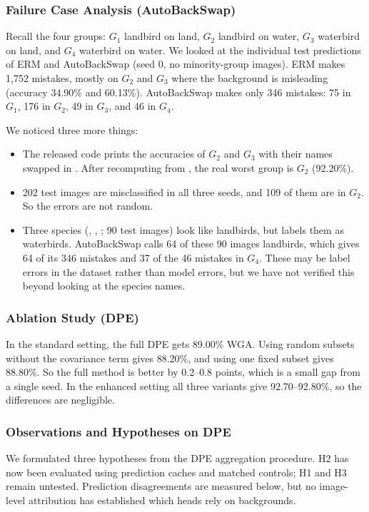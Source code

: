 \documentclass[runningheads]{llncs}
\begin{document}
\subsubsection{Failure Case Analysis (AutoBackSwap)}
Recall the four groups: $G_1$ landbird on land, $G_2$ landbird on water, $G_3$ waterbird on land, and $G_4$ waterbird on water. We looked at the individual test predictions of ERM and AutoBackSwap (seed 0, no minority-group images). ERM makes 1,752 mistakes, mostly on $G_2$ and $G_3$ where the background is misleading (accuracy 34.90\% and 60.13\%). AutoBackSwap makes only 346 mistakes: 75 in $G_1$, 176 in $G_2$, 49 in $G_3$, and 46 in $G_4$.

We noticed three more things:
\begin{itemize}
    \item The released code prints the accuracies of $G_2$ and $G_3$ with their names swapped in . After recomputing from , the real worst group is $G_2$ (92.20\%).
    \item 202 test images are misclassified in all three seeds, and 109 of them are in $G_2$. So the errors are not random.
    \item Three species (, , ; 90 test images) look like landbirds, but  labels them as waterbirds. AutoBackSwap calls 64 of these 90 images landbirds, which gives 64 of its 346 mistakes and 37 of the 46 mistakes in $G_4$. These may be label errors in the dataset rather than model errors, but we have not verified this beyond looking at the species names.
\end{itemize}

\subsubsection{Ablation Study (DPE)}
In the standard setting, the full DPE gets 89.00\% WGA. Using random subsets without the covariance term gives 88.20\%, and using one fixed subset gives 88.80\%. So the full method is better by 0.2--0.8 points, which is a small gap from a single seed. In the enhanced setting all three variants give 92.70--92.80\%, so the differences are negligible.

\subsubsection{Observations and Hypotheses on DPE}
We formulated three hypotheses from the DPE aggregation procedure. H2 has now been evaluated using prediction caches and matched controls; H1 and H3 remain untested. Prediction disagreements are measured below, but no image-level attribution has established which heads rely on backgrounds.
\end{document}
